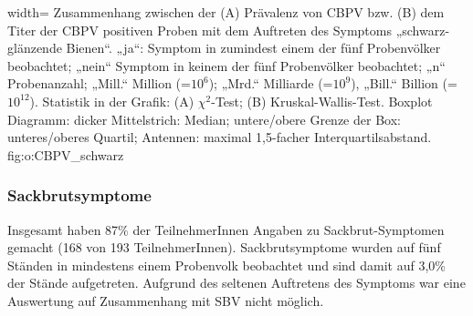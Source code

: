  
  {width=\textwidth} %
  {Zusammenhang zwischen der (A) Prävalenz von CBPV bzw. (B) dem Titer der CBPV positiven Proben mit dem Auftreten des Symptoms „schwarz-glänzende Bienen“. „ja“: Symptom in zumindest einem der fünf Probenvölker beobachtet; „nein“ Symptom in keinem der fünf Probenvölker beobachtet; „n“ Probenanzahl; „Mill.“ Million (=$10^6$); „Mrd.“ Milliarde (=$10^9$), „Bill.“ Billion (=$10^{12}$). Statistik in der Grafik: (A) $\chi^2$-Test; (B) Kruskal-Wallis-Test. Boxplot Diagramm: dicker Mittelstrich: Median; untere/obere Grenze der Box: unteres/oberes Quartil; Antennen: maximal 1,5-facher Interquartilsabstand.} %
  {} %
  {fig:o:CBPV_schwarz} %

\subsubsection{Sackbrutsymptome}

Insgesamt haben 87\% der TeilnehmerInnen Angaben zu Sackbrut-Symptomen gemacht (168 von 193 TeilnehmerInnen). Sackbrutsymptome wurden auf fünf Ständen in mindestens einem Probenvolk beobachtet und sind damit auf 3,0\% der Stände aufgetreten. Aufgrund des seltenen Auftretens des Symptoms war eine Auswertung auf Zusammenhang mit SBV nicht möglich.